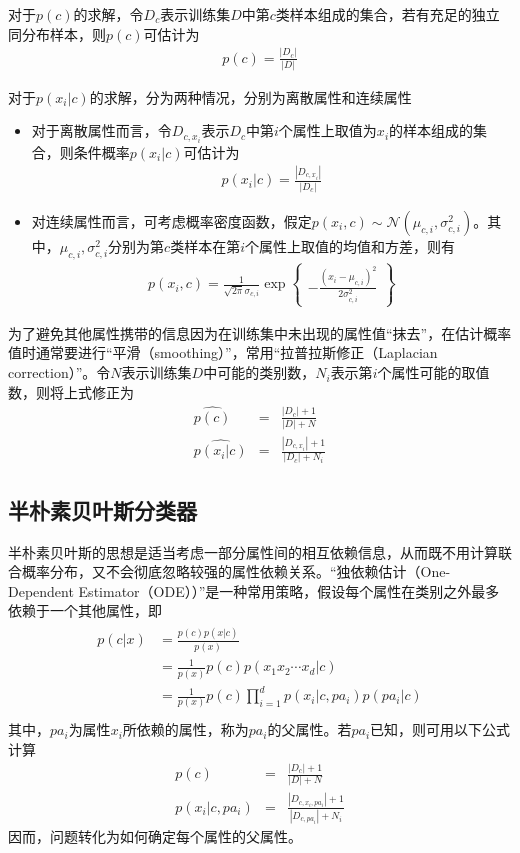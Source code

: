 对于$p(c)$的求解，令$D_c$表示训练集$D$中第$c$类样本组成的集合，若有充足的独立同分布样本，则$p(c)$可估计为
\begin{eqnarray}
p(c)=\frac{|D_c|}{|D|}
\end{eqnarray}

对于$p(x_i|c)$的求解，分为两种情况，分别为离散属性和连续属性
\begin{itemize}
\item 对于离散属性而言，令$D_{c,x_i}$表示$D_c$中第$i$个属性上取值为$x_i$的样本组成的集合，则条件概率$p(x_i|c)$可估计为
\begin{eqnarray}
p(x_i|c)=\frac{|D_{c,x_i}|}{|D_c|}
\end{eqnarray}
\item 对连续属性而言，可考虑概率密度函数，假定$p(x_i,c)\sim\mathcal{N}(\mu_{c,i},\sigma_{c,i}^2)$。其中，$\mu_{c,i},\sigma_{c,i}^2$分别为第$c$类样本在第$i$个属性上取值的均值和方差，则有
\begin{eqnarray}
p(x_i,c)=\frac{1}{\sqrt{2\pi}\sigma_{c,i}}\exp
\left\lbrace
\begin{aligned}
-\frac{(x_i-\mu_{c,i})^2}{2\sigma_{c,i}^2}
\end{aligned}
\right\rbrace
\end{eqnarray}
\end{itemize}
为了避免其他属性携带的信息因为在训练集中未出现的属性值“抹去”，在估计概率值时通常要进行“平滑（smoothing）”，常用“拉普拉斯修正（Laplacian correction）”。令$N$表示训练集$D$中可能的类别数，$N_i$表示第$i$个属性可能的取值数，则将上式修正为
\begin{eqnarray}
\hat{p(c)}&=&\frac{|D_c|+1}{|D|+N}\\
\hat{p(x_i|c)}&=&\frac{|D_{c,x_i}|+1}{|D_c|+N_i}
\end{eqnarray}

\subsection{半朴素贝叶斯分类器}
半朴素贝叶斯的思想是适当考虑一部分属性间的相互依赖信息，从而既不用计算联合概率分布，又不会彻底忽略较强的属性依赖关系。“独依赖估计（One-Dependent Estimator（ODE））”是一种常用策略，假设每个属性在类别之外最多依赖于一个其他属性，即
\begin{eqnarray}
\begin{aligned}
p(c|x)&=\frac{p(c)p(x|c)}{p(x)}\\
&=\frac{1}{p(x)}p(c)p(x_1x_2\cdots x_d|c)\\
&=\frac{1}{p(x)}p(c)\prod_{i=1}^dp(x_i|c,pa_i)p(pa_i|c)\\
\end{aligned}
\end{eqnarray}
其中，$pa_i$为属性$x_i$所依赖的属性，称为$pa_i$的父属性。若$pa_i$已知，则可用以下公式计算
\begin{eqnarray}
p(c)&=&\frac{|D_c|+1}{|D|+N}\\
p(x_i|c,pa_i)&=&\frac{|D_{c,x_i,pa_i}|+1}{|D_{c,pa_i}|+N_i}
\end{eqnarray}
因而，问题转化为如何确定每个属性的父属性。

